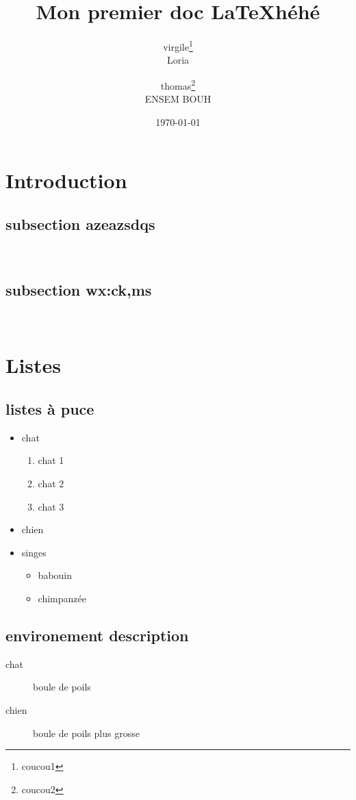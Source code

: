 \documentclass[a4paper,12pt]{article}
\begin{document}
\title{Mon premier doc \LaTeX héhé}
\author{virgile\thanks{coucou1}\\Loria \and thomas\thanks{coucou2}\\ENSEM BOUH}%
\date{\today}


\maketitle

\begin{abstract}
\blindtext
\end{abstract}

\tableofcontents
\section{Introduction}


\subsection{subsection azeazsdqs}
\blindtext \\
\subsection{subsection wx:ck,ms}
\blindtext \\

\newpage
\section{Listes}
\subsection{listes à puce}

\renewcommand\labelitemi{X}

\begin{itemize}
  \item chat
  \begin{enumerate}
    \item chat 1
    \item chat 2
    \item chat 3
  \end{enumerate}
  \item chien
  \item singes
  \begin{itemize}
    \item babouin
    \item chimpanzée
  \end{itemize}
\end{itemize}

\subsection{environement description}
\begin{description}
  \item[chat] boule de poils
  \item[chien] boule de poils plus grosse \blindtext
\end{description}
\end{document}
